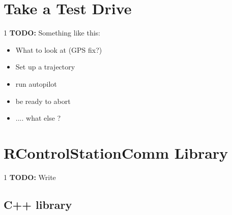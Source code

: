 \documentclass[12pt]{article} %
\def\printtodos{0}
\newcommand{\todo}[1]{
  \if\printtodos1
      {\color{red} \textbf{TODO:} #1}
  \fi}
\begin{document}
\section{Take a Test Drive}

\todo{Something like this:}
\begin{itemize}
\item What to look at (GPS fix?)
\item Set up a trajectory
\item run autopilot
\item be ready to abort
\item .... what else ? 
\end{itemize} 





\section{RControlStationComm Library}\label{sec:comm}

\todo{Write}
\subsection{C++ library}
\end{document}
